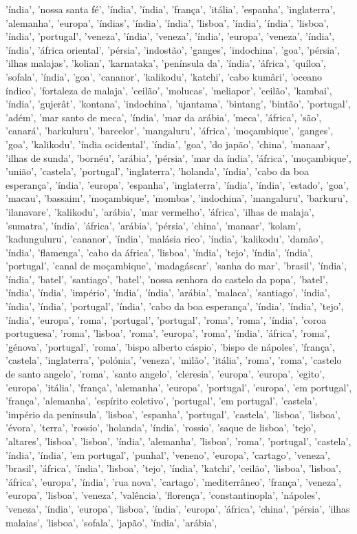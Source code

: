 \documentclass{article}
\begin{document}
\begin{itemize}
'índia', 'nossa santa fé', 'índia', 'índia', 'frança', 'itália', 'espanha', 'inglaterra', 'alemanha', 'europa', 'índias', 'índia', 'índia', 'lisboa', 'índia', 'índia', 'lisboa', 'índia', 'portugal', 'veneza', 'índia', 'veneza', 'índia', 'europa', 'veneza', 'índia', 'índia', 'áfrica oriental', 'pérsia', 'indostão', 'ganges', 'indochina', 'goa', 'pérsia', 'ilhas malajas', 'kolian', 'karnataka', 'península da', 'índia', 'áfrica', 'quíloa', 'sofala', 'índia', 'goa', 'cananor', 'kalikodu', 'katchi', 'cabo kumâri', 'oceano índico', 'fortaleza de malaja', 'ceilão', 'molucas', 'meliapor', 'ceilão', 'kambai', 'índia', 'gujerât', 'kontana', 'indochina', 'ujantama', 'bintang', 'bintão', 'portugal', 'adém', 'mar santo de meca', 'índia', 'mar da arábia', 'meca', 'áfrica', 'são', 'canará', 'barkuluru', 'barcelor', 'mangaluru', 'áfrica', 'moçambique', 'ganges', 'goa', 'kalikodu', 'índia ocidental', 'índia', 'goa', 'do japão', 'china', 'manaar', 'ilhas de sunda', 'bornéu', 'arábia', 'pérsia', 'mar da índia', 'áfrica', 'moçambique', 'união', 'castela', 'portugal', 'inglaterra', 'holanda', 'índia', 'cabo da boa esperança', 'índia', 'europa', 'espanha', 'inglaterra', 'índia', 'índia', 'estado', 'goa', 'macau', 'bassaim', 'moçambique', 'mombas', 'indochina', 'mangaluru', 'barkuru', 'ilanavare', 'kalikodu', 'arábia', 'mar vermelho', 'áfrica', 'ilhas de malaja', 'sumatra', 'índia', 'áfrica', 'arábia', 'pérsia', 'china', 'manaar', 'kolam', 'kadunguluru', 'cananor', 'índia', 'malásia rico', 'índia', 'kalikodu', 'damão', 'índia', 'flamenga', 'cabo da áfrica', 'lisboa', 'índia', 'tejo', 'índia', 'índia', 'portugal', 'canal de moçambique', 'madagáscar', 'sanha do mar', 'brasil', 'índia', 'índia', 'batel', 'santiago', 'batel', 'nossa senhora do castelo da popa', 'batel', 'índia', 'índia', 'império', 'índia', 'índia', 'arábia', 'malaca', 'santiago', 'índia', 'índia', 'índia', 'portugal', 'índia', 'cabo da boa esperança', 'índia', 'índia', 'tejo', 'índia', 'europa', 'roma', 'portugal', 'portugal', 'roma', 'roma', 'índia', 'coroa portuguesa', 'roma', 'lisboa', 'roma', 'europa', 'roma', 'índia', 'áfrica', 'roma', 'génova', 'portugal', 'roma', 'bispo alberto cáspio', 'bispo de nápoles', 'frança', 'castela', 'inglaterra', 'polónia', 'veneza', 'milão', 'itália', 'roma', 'roma', 'castelo de santo angelo', 'roma', 'santo angelo', 'cleresia', 'europa', 'europa', 'egito', 'europa', 'itália', 'frança', 'alemanha', 'europa', 'portugal', 'europa', 'em portugal', 'frança', 'alemanha', 'espírito coletivo', 'portugal', 'em portugal', 'castela', 'império da península', 'lisboa', 'espanha', 'portugal', 'castela', 'lisboa', 'lisboa', 'évora', 'terra', 'rossio', 'holanda', 'índia', 'rossio', 'saque de lisboa', 'tejo', 'altares', 'lisboa', 'lisboa', 'índia', 'alemanha', 'lisboa', 'roma', 'portugal', 'castela', 'índia', 'índia', 'em portugal', 'punhal', 'veneno', 'europa', 'cartago', 'veneza', 'brasil', 'áfrica', 'índia', 'lisboa', 'tejo', 'índia', 'katchi', 'ceilão', 'lisboa', 'lisboa', 'áfrica', 'europa', 'índia', 'rua nova', 'cartago', 'mediterrâneo', 'frança', 'veneza', 'europa', 'lisboa', 'veneza', 'valência', 'florença', 'constantinopla', 'nápoles', 'veneza', 'índia', 'europa', 'lisboa', 'índia', 'europa', 'áfrica', 'china', 'pérsia', 'ilhas malaias', 'lisboa', 'sofala', 'japão', 'índia', 'arábia', 
\end{itemize}
\end{document}
